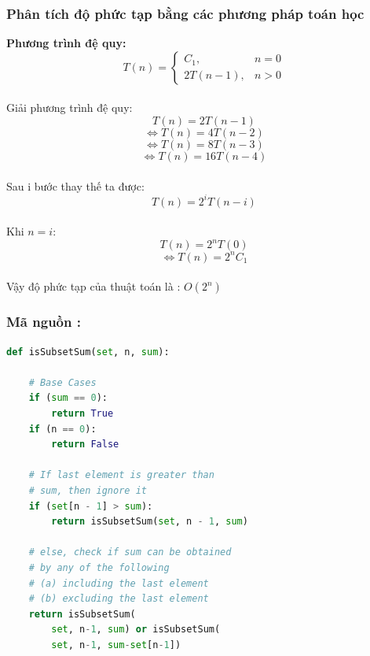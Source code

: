 \documentclass[a4paper]{article}
\newcommand\tab[1][1cm]{\hspace*{#1}}
\begin{document}
\subsubsection{Phân tích độ phức tạp bằng các phương pháp toán học}
\tab \textbf{Phương trình đệ quy:}
\[T(n) = \begin{cases} C_1, & n=0 \\ 2T(n-1), & n>0 \end{cases}\]
\\
Giải phương trình đệ quy:
$$T(n) = 2T(n-1)$$
$$\Leftrightarrow T(n) = 4T(n-2)$$
$$\Leftrightarrow T(n) = 8T(n-3)$$
$$\Leftrightarrow T(n) = 16T(n-4)$$\\
Sau i bước thay thế ta được:
$$T(n) = 2^i T(n-i)$$\\
Khi $n=i$:
$$T(n) = 2^n T(0)$$
$$\Leftrightarrow T(n) = 2^n C_1$$\\
Vậy độ phức tạp của thuật toán là : $ O(2^n)$


\subsubsection{Mã nguồn :}
\begin{center}
    \begin{lstlisting}[language=Python, caption=Solve by Backtracking]
def isSubsetSum(set, n, sum):
 
    # Base Cases
    if (sum == 0):
        return True
    if (n == 0):
        return False
 
    # If last element is greater than
    # sum, then ignore it
    if (set[n - 1] > sum):
        return isSubsetSum(set, n - 1, sum)
 
    # else, check if sum can be obtained
    # by any of the following
    # (a) including the last element
    # (b) excluding the last element
    return isSubsetSum(
        set, n-1, sum) or isSubsetSum(
        set, n-1, sum-set[n-1])
\end{lstlisting}
\end{center}
\end{document}
